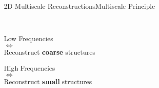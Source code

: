 \begin{frame}{2D Multiscale Reconstructions}{Multiscale Principle \cite{bunks}}
  \vspace{-0.45cm}
  \begin{multicols}{2}

    \begin{center}
    ~
    \vspace{0.8cm}

    Low Frequencies \\ $\Longleftrightarrow$ \\ Reconstruct \textbf{coarse} structures

    \vspace{2.4cm}

    High Frequencies \\ $\Longleftrightarrow$ \\ Reconstruct \textbf{small} structures
    \end{center}


\end{multicols}
\end{frame}
